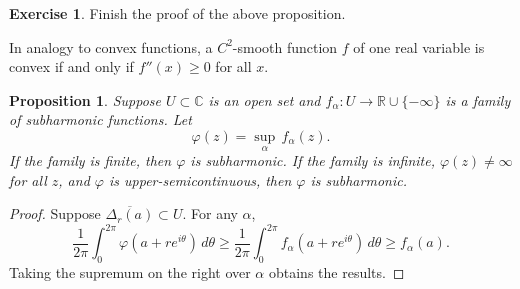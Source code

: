 \documentclass[12pt,openany]{book}
\newcommand{\C}{{\mathbb{C}}}
\newcommand{\R}{{\mathbb{R}}}
\theoremstyle{plain}
\newtheorem{prop}[thm]{Proposition}
\theoremstyle{remark}
\theoremstyle{definition}
\newenvironment{exbox}{%
    \def\FrameCommand{\vrule width 1pt \relax\hspace {10pt}}%
    \MakeFramed {\advance \hsize -\width \FrameRestore }%
}{%
    \endMakeFramed
}
\theoremstyle{exercise}
\newtheorem{exercise}{Exercise}[section]
\theoremstyle{example}
\begin{document}
\begin{exbox}
\begin{exercise}
Finish the proof of the above proposition.
\end{exercise}
\end{exbox}

In analogy to convex functions, a $C^2$-smooth function $f$ of one
real variable is convex if and only if $f''(x) \geq 0$ for all $x$.

\pagebreak[2]
\begin{prop}
Suppose $U \subset \C$ is an open set and $f_\alpha \colon U \to \R \cup \{ -\infty \}$
is a family of subharmonic functions.  Let
\begin{equation*}
\varphi(z) = \sup_\alpha\, f_\alpha(z) .
\end{equation*}
If the family is finite, then $\varphi$ is subharmonic.
If the family is infinite, $\varphi(z) \not= \infty$ for
all $z$, and $\varphi$
is upper-semicontinuous, then $\varphi$ is subharmonic.
\end{prop}

\begin{proof}
Suppose $\overline{\Delta_r(a)} \subset U$.  For any $\alpha$,
\begin{equation*}
\frac{1}{2\pi} \int_0^{2\pi} \varphi (a+re^{i\theta})\, d\theta 
\geq
\frac{1}{2\pi} \int_0^{2\pi} f_\alpha (a+re^{i\theta})\, d\theta 
\geq f_\alpha(a) .
\end{equation*}
Taking the supremum on the right over $\alpha$ obtains the results.
\end{proof}
\end{document}
